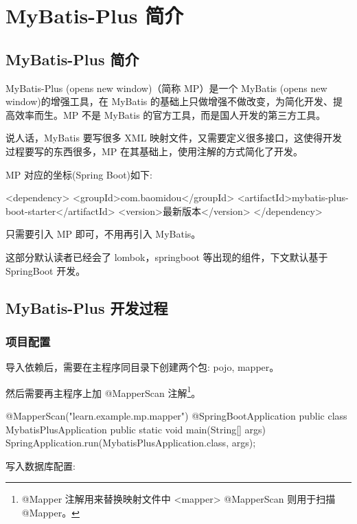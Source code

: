 \section{MyBatis-Plus 简介}

\subsection{MyBatis-Plus 简介}

MyBatis-Plus (opens new window)（简称 MP）是一个 MyBatis (opens new window)的增强工具，在 MyBatis 的基础上只做增强不做改变，为简化开发、提高效率而生。MP 不是 MyBatis 的官方工具，而是国人开发的第三方工具。

说人话，MyBatis 要写很多 XML 映射文件，又需要定义很多接口，这使得开发过程要写的东西很多，MP 在其基础上，使用注解的方式简化了开发。

MP 对应的坐标(Spring Boot)如下:

\begin{xml}
<dependency>
    <groupId>com.baomidou</groupId>
    <artifactId>mybatis-plus-boot-starter</artifactId>
    <version>最新版本</version>
</dependency>
\end{xml}

只需要引入 MP 即可，不用再引入 MyBatis。

这部分默认读者已经会了 lombok，springboot 等出现的组件，下文默认基于 SpringBoot 开发。

\subsection{MyBatis-Plus 开发过程}

\subsubsection*{项目配置}

导入依赖后，需要在主程序同目录下创建两个包: pojo, mapper。

然后需要再主程序上加 @MapperScan 注解\footnote{@Mapper 注解用来替换映射文件中 <mapper> @MapperScan 则用于扫描 @Mapper。}。

\begin{Java}
@MapperScan("learn.example.mp.mapper")
@SpringBootApplication
public class MybatisPlusApplication {
    public static void main(String[] args) {
        SpringApplication.run(MybatisPlusApplication.class, args);
    }
}
\end{Java}


写入数据库配置:

